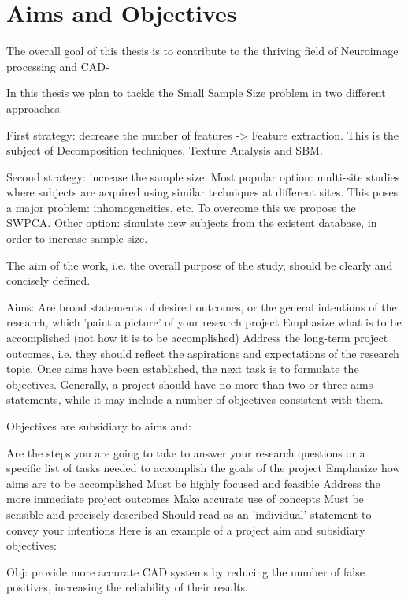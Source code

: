 
\section{Aims and Objectives}\label{sec:overview}
The overall goal of this thesis is to contribute to the thriving field of Neuroimage processing and \ac{CAD}-  

In this thesis we plan to tackle the Small Sample Size problem in two different approaches. 


First strategy: decrease the number of features -> Feature extraction. This is the subject of Decomposition techniques, Texture Analysis and \ac{SBM}. 

Second strategy: increase the sample size. Most popular option: multi-site studies where subjects are acquired using similar techniques at different sites. This poses a major problem: inhomogeneities, etc. To overcome this we propose the \ac{SWPCA}. Other option: simulate new subjects from the existent database, in order to increase sample size.



The aim of the work, i.e. the overall purpose of the study, should be clearly and concisely defined.

Aims:
Are broad statements of desired outcomes, or the general intentions of the research, which 'paint a picture' of your research project
Emphasize what is to be accomplished (not how it is to be accomplished)
Address the long-term project outcomes, i.e. they should reflect the aspirations and expectations of the research topic.
Once aims have been established, the next task is to formulate the objectives. Generally, a project should have no more than two or three aims statements, while it may include a number of objectives consistent with them.

Objectives are subsidiary to aims and:

Are the steps you are going to take to answer your research questions or a specific list of tasks needed to accomplish the goals of the project
Emphasize how aims are to be accomplished
Must be highly focused and feasible
Address the more immediate project outcomes
Make accurate use of concepts
Must be sensible and precisely described
Should read as an 'individual' statement to convey your intentions
Here is an example of a project aim and subsidiary objectives:


Obj: provide more accurate CAD systems by reducing the number of false positives, increasing the reliability of their results. 



